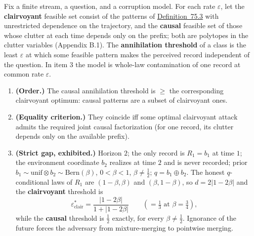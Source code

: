 
\begin{thmplain}

Fix a finite stream, a question, and a corruption model. For each rate \(\varepsilon\), let the \textbf{clairvoyant} feasible set consist of the patterns of \hyperlink{stmt:75.3}{Definition~75.3} with unrestricted dependence on the trajectory, and the \textbf{causal} feasible set of those whose clutter at each time depends only on the prefix; both are polytopes in the clutter variables (Appendix B.1). The \textbf{annihilation threshold} of a class is the least \(\varepsilon\) at which some feasible pattern makes the perceived record independent of the question. In item 3 the model is whole-law contamination of one record at common rate \(\varepsilon\).

\begin{enumerate}
\def\labelenumi{\arabic{enumi}.}
\tightlist
\item
  \textbf{(Order.)} The causal annihilation threshold is \(\ge\) the corresponding clairvoyant optimum: causal patterns are a subset of clairvoyant ones.
\item
  \textbf{(Equality criterion.)} They coincide iff some optimal clairvoyant attack admits the required joint causal factorization (for one record, its clutter depends only on the available prefix).
\item
  \textbf{(Strict gap, exhibited.)} Horizon \(2\); the only record is \(R_1 = b_1\) at time \(1\); the environment coordinate \(b_2\) realizes at time \(2\) and is never recorded; prior \(b_1 \sim \mathrm{unif} \otimes b_2 \sim \mathrm{Bern}(\beta)\), \(0<\beta<1\), \(\beta\ne\tfrac12\); \(q=b_1\oplus b_2\). The honest \(q\)-conditional laws of \(R_1\) are \((1-\beta, \beta)\) and \((\beta, 1-\beta)\), so \(d = 2|1-2\beta|\) and the \textbf{clairvoyant} threshold is
  \[
  \varepsilon^*_{\mathrm{clair}} = \frac{|1-2\beta|}{1+|1-2\beta|} \qquad (= \tfrac13 \text{ at } \beta = \tfrac34),
  \]
  while the \textbf{causal} threshold is \(\tfrac12\) exactly, for every \(\beta \ne \tfrac12\). Ignorance of the future forces the adversary from mixture-merging to pointwise merging.
\end{enumerate}
\end{thmplain}

